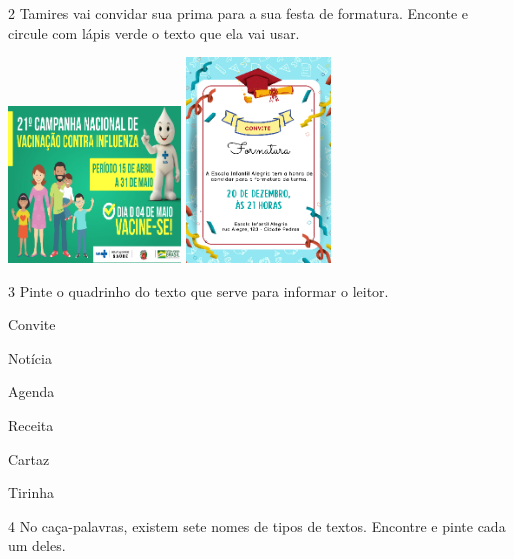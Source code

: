 \num{2} Tamires vai convidar sua prima para a sua festa de formatura. 
Enconte e circule com lápis verde o texto que ela vai usar. 


\includegraphics[width=1.80556in,height=1.63403in]{media/image100.png}
\includegraphics[width=1.51458in,height=2.14444in]{media/image103.png}


\num{3} Pinte o quadrinho do texto que serve para informar o leitor.


\begin{boxlist}
\boxitem[] Convite

\boxitem[] Notícia

\boxitem[] Agenda 

\boxitem[] Receita

\boxitem[] Cartaz 

\boxitem[] Tirinha
\end{boxlist}

\num{4} No caça-palavras, existem sete nomes de tipos de textos. 
Encontre e pinte cada um deles.  


